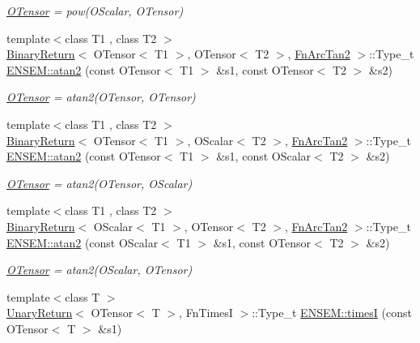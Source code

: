 \begin{DoxyCompactItemize}
\begin{DoxyCompactList}\small\item\em \mbox{\hyperlink{classENSEM_1_1OTensor}{O\+Tensor}} = pow(\+O\+Scalar, O\+Tensor) \end{DoxyCompactList}\item 
{\footnotesize template$<$class T1 , class T2 $>$ }\\\mbox{\hyperlink{structBinaryReturn}{Binary\+Return}}$<$ O\+Tensor$<$ T1 $>$, O\+Tensor$<$ T2 $>$, \mbox{\hyperlink{structFnArcTan2}{Fn\+Arc\+Tan2}} $>$\+::Type\+\_\+t \mbox{\hyperlink{group__obstensor_ga167556ae7bebc48d05e83003206f36dd}{E\+N\+S\+E\+M\+::atan2}} (const O\+Tensor$<$ T1 $>$ \&s1, const O\+Tensor$<$ T2 $>$ \&s2)
\begin{DoxyCompactList}\small\item\em \mbox{\hyperlink{classENSEM_1_1OTensor}{O\+Tensor}} = atan2(\+O\+Tensor, O\+Tensor) \end{DoxyCompactList}\item 
{\footnotesize template$<$class T1 , class T2 $>$ }\\\mbox{\hyperlink{structBinaryReturn}{Binary\+Return}}$<$ O\+Tensor$<$ T1 $>$, O\+Scalar$<$ T2 $>$, \mbox{\hyperlink{structFnArcTan2}{Fn\+Arc\+Tan2}} $>$\+::Type\+\_\+t \mbox{\hyperlink{group__obstensor_gaba8ed2c3683bbcbda35e8a372d7ee2e6}{E\+N\+S\+E\+M\+::atan2}} (const O\+Tensor$<$ T1 $>$ \&s1, const O\+Scalar$<$ T2 $>$ \&s2)
\begin{DoxyCompactList}\small\item\em \mbox{\hyperlink{classENSEM_1_1OTensor}{O\+Tensor}} = atan2(\+O\+Tensor, O\+Scalar) \end{DoxyCompactList}\item 
{\footnotesize template$<$class T1 , class T2 $>$ }\\\mbox{\hyperlink{structBinaryReturn}{Binary\+Return}}$<$ O\+Scalar$<$ T1 $>$, O\+Tensor$<$ T2 $>$, \mbox{\hyperlink{structFnArcTan2}{Fn\+Arc\+Tan2}} $>$\+::Type\+\_\+t \mbox{\hyperlink{group__obstensor_ga81f7f5b4d6ba20b09ce1c6a2f7284657}{E\+N\+S\+E\+M\+::atan2}} (const O\+Scalar$<$ T1 $>$ \&s1, const O\+Tensor$<$ T2 $>$ \&s2)
\begin{DoxyCompactList}\small\item\em \mbox{\hyperlink{classENSEM_1_1OTensor}{O\+Tensor}} = atan2(\+O\+Scalar, O\+Tensor) \end{DoxyCompactList}\item 
{\footnotesize template$<$class T $>$ }\\\mbox{\hyperlink{structUnaryReturn}{Unary\+Return}}$<$ O\+Tensor$<$ T $>$, Fn\+TimesI $>$\+::Type\+\_\+t \mbox{\hyperlink{group__obstensor_ga014bfcb56266f5301dcc8a1fe479f8b1}{E\+N\+S\+E\+M\+::timesI}} (const O\+Tensor$<$ T $>$ \&s1)

\end{DoxyCompactItemize}

